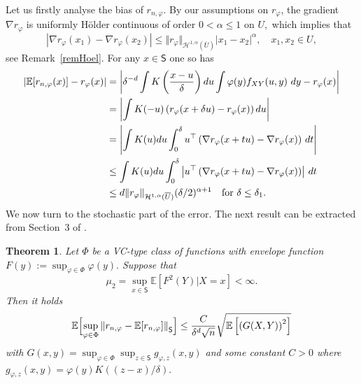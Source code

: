 \documentclass[a4paper,11pt]{amsart}
\theoremstyle{plain}
\newtheorem{theorem}{Theorem}
\theoremstyle{remark}
\begin{document}
Let us firstly analyse the bias of $r_{n,\varphi}.$ By our assumptions on $r_\varphi$, the
gradient $\nabla r_{\varphi}$ is uniformly H\"{o}lder continuous of order
$0<\alpha\leq1$ on $U,$ which implies that 
\[
\left\vert \nabla r_{\varphi}(x_{1})-\nabla r_{\varphi}(x_{2})\right\vert \leq
\Vert r_{\varphi}\Vert_{\mathcal{H}%
^{1,\alpha}(\overline{U})}\left\vert x_{1}-x_{2}\right\vert ^{\alpha},\quad x_{1},x_{2}\in U,
\]
see Remark~\ref{remHoel}. For any $x\in\mathsf{S}$ one so has
\begin{align}
|\mathbb{E}[r_{n,\varphi}(x)]-r_{\varphi}(x)| &  =\left\vert \delta^{-d}\int
K\left(  \frac{x-u}{\delta}\right)  du\int\varphi(y)f_{XY}%
(u,y)\,\,dy-r_{\varphi}(x)\right\vert\notag \\
&  =\left\vert \int K(-u)\left(  r_{\varphi}(x+\delta u)-r_{\varphi
}(x)\right)  du\right\vert\notag  \\
&  =\left\vert \int K(u)du\int_{0}^{\delta}u^{\top}\left(  \nabla r_{\varphi
}(x+tu)-\nabla r_{\varphi}(x)\right)  \,dt\right\vert \notag \\
&  \leq\int K(u)du\int_{0}^{\delta}\left\vert u^{\top}\left(  \nabla
r_{\varphi}(x+tu)-\nabla r_{\varphi}(x)\right)  \right\vert \,dt \notag \\
&  \leq {d}\Vert r_{\varphi}\Vert_{\mathcal{H}%
^{1,\alpha}(\overline{U})}(\delta/2)^{\alpha+1}\text{ \ \ for }\delta\leq\delta_{1}.\label{det_term_err}
\end{align}
We now turn to the stochastic part of the error.
The next result can be extracted from Section~3 of \cite{dony2009uniform}. 
\begin{theorem}
Let $\Phi$ be a VC-type class of functions with envelope function
$F(y):=\sup_{\varphi\in\Phi}\varphi(y).$ Suppose that 
\[
\mu_{2}=\sup_{x\in \mathsf{S}}\mathbb{E}\left[  F^{2}(Y)|X=x\right]  <\infty.
\]
Then it holds
\[
\mathbb{E}\Bigl[\sup_{\varphi\in\Phi}\left\Vert r_{n,\varphi}-\mathbb{E}%
[r_{n,\varphi}]\right\Vert _{\mathsf{S}}\Bigr]\leq\frac{C}{\delta^{d}\sqrt{n}}%
\sqrt{\mathbb{E}\left[  \left(  G(X,Y)\right)  ^{2}\right]  }%
\]
with $G(x,y)=\sup_{\varphi\in\Phi}\sup_{z\in \mathsf{S}}g_{\varphi,z}(x,y)$ and some
constant $C>0$ where $g_{\varphi,z}(x,y)=\varphi(y)K((z-x)/\delta).$
\end{theorem}
\end{document}
